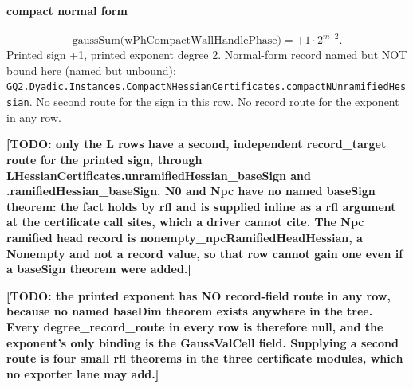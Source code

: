 \paragraph{compact normal form}
\[\mathrm{gaussSum}\bigl(\mathrm{wPhCompactWallHandlePhase}\bigr)=+1\cdot 2^{m\cdot 2}.\]
Printed sign +1, printed exponent degree 2. Normal-form record named but NOT bound here (named but unbound): \texttt{GQ2.Dyadic.Instances.CompactNHessianCertificates.compactNUnramifiedHessian}.
No second route for the sign in this row. No record route for the exponent in any row.
\par\noindent\textbf{[TODO: only the L rows have a second, independent record\_target route for the printed sign, through LHessianCertificates.unramifiedHessian\_baseSign and .ramifiedHessian\_baseSign. N0 and Npc have no named baseSign theorem: the fact holds by rfl and is supplied inline as a rfl argument at the certificate call sites, which a driver cannot cite. The Npc ramified head record is nonempty\_npcRamifiedHeadHessian, a Nonempty and not a record value, so that row cannot gain one even if a baseSign theorem were added.]}
\par\noindent\textbf{[TODO: the printed exponent has NO record-field route in any row, because no named baseDim theorem exists anywhere in the tree. Every degree\_record\_route in every row is therefore null, and the exponent's only binding is the GaussValCell field. Supplying a second route is four small rfl theorems in the three certificate modules, which no exporter lane may add.]}
